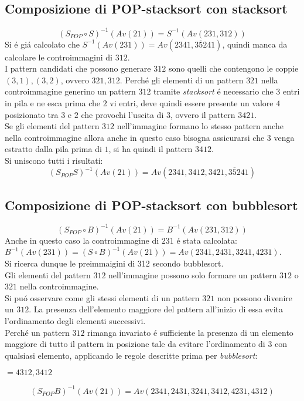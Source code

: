\subsection*{Composizione di {POP-stacksort} con {stacksort}}
$$(S_{POP}\circ{S})^{-1}(Av(21))=S^{-1}(Av(231,312))$$
Si \'e gi\'a calcolato che $S^{-1}(Av(231))=Av(2341, 3\overline{5}241)$, quindi manca da calcolare le controimmagini di $312$.\\
I pattern candidati che possono generare $312$ sono quelli che contengono le coppie $(3,1),(3,2)$, ovvero $321, 312$.
Perch\'e gli elementi di un pattern $321$ nella controimmagine generino un pattern $312$ tramite \textit{stacksort} \'e necessario che $3$ entri in pila e ne esca prima che $2$ vi entri, deve quindi essere presente un valore $4$ posizionato tra $3$ e $2$ che provochi l'uscita di $3$, ovvero il pattern $3421$.\\
Se gli elementi del pattern $312$ nell'immagine formano lo stesso pattern anche nella controimmagine allora anche in questo caso bisogna assicurarsi che $3$ venga estratto dalla pila prima di $1$, si ha quindi il pattern $3412$.\\Si uniscono tutti i risultati:
$$(S_{POP}S)^{-1}(Av(21))=Av(2341, 3412, 3421, 3\overline{5}241)$$
\subsection*{Composizione di {POP-stacksort} con {bubblesort}}
$$(S_{POP}\circ{B})^{-1}(Av(21))=B^{-1}(Av(231,312))$$
Anche in questo caso la controimmagine di $231$ \'e stata calcolata: $B^{-1}(Av(231)) = (S\circ{B})^{-1}(Av(21)) = Av(2341, 2431, 3241, 4231)$.\\
Si ricerca dunque le preimmaigini di 312 secondo bubblesort. \\
Gli elementi del pattern $312$ nell'immagine possono solo formare un pattern $312$ o $321$ nella controimmagine.\\
Si pu\'o osservare come gli stessi elementi di un pattern $321$ non possono divenire un $312$. La presenza dell'elemento maggiore del pattern all'inizio di essa evita l'ordinamento degli elementi successivi.\\
Perch\'e un pattern $312$ rimanga invariato \'e sufficiente la presenza di un elemento maggiore di tutto il pattern in posizione tale da evitare l'ordinamento di $3$ con qualsiasi elemento, applicando le regole descritte prima per \textit{bubblesort}: 
\begin{center}
$=4312,3412$
\end{center}
$$(S_{POP}{B})^{-1}(Av(21))=Av(2341, 2431, 3241, 3412, 4231, 4312)$$
